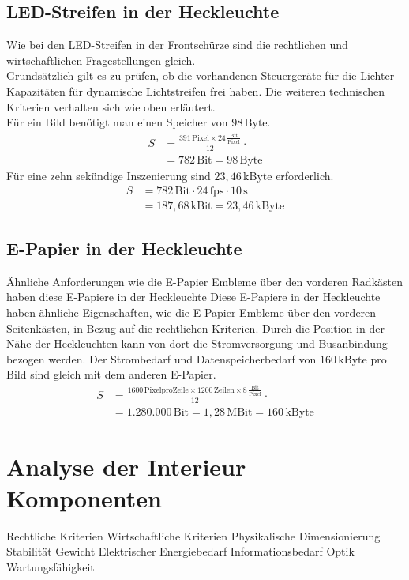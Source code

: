 \subsection{LED-Streifen in der Heckleuchte}
Wie bei den LED-Streifen in der Frontschürze sind die rechtlichen und wirtschaftlichen Fragestellungen gleich. \\
Grundsätzlich gilt es zu prüfen, ob die vorhandenen Steuergeräte für die Lichter Kapazitäten für dynamische Lichtstreifen frei haben.
Die weiteren technischen Kriterien verhalten sich wie oben erläutert. \\
Für ein Bild benötigt man einen Speicher von $ 98\,\mathrm{Byte} $.
\begin{align}
	S &= \frac{391\,\mathrm{Pixel} \times 24\,\frac{\mathrm{Bit}}{\mathrm{Pixel}}}{12} \cdot \\
	&= 782\,\mathrm{Bit} = 98\,\mathrm{Byte}
\end{align}
Für eine zehn sekündige Inszenierung sind $ 23,46\,\mathrm{kByte} $ erforderlich.
\begin{align}
	S &= 782\,\mathrm{Bit} \cdot 24\,\mathrm{fps} \cdot 10\,\mathrm{s}\\
	&= 187,68\,\mathrm{kBit} = 23,46\,\mathrm{kByte}
\end{align}
\subsection{E-Papier in der Heckleuchte}
Ähnliche Anforderungen wie die E-Papier Embleme über den vorderen Radkästen haben diese E-Papiere in der Heckleuchte
Diese E-Papiere in der Heckleuchte haben ähnliche Eigenschaften, wie die E-Papier Embleme über den vorderen Seitenkästen, in Bezug auf die rechtlichen Kriterien. Durch die Position in der Nähe der Heckleuchten kann von dort die Stromversorgung und Busanbindung bezogen werden. Der Strombedarf und Datenspeicherbedarf von $ 160\,\mathrm{kByte} $ pro Bild sind gleich mit dem anderen E-Papier. 
\begin{align}
	S &= \frac{1600\,\mathrm{Pixel pro Zeile} \times 1200\,\mathrm{Zeilen} \times 8\,\frac{\mathrm{Bit}}{\mathrm{Pixel}}}{12} \cdot \\
	&= 1.280.000\,\mathrm{Bit} = 1,28\,\mathrm{MBit} = 160\,\mathrm{kByte}
\end{align}
\section{Analyse der Interieur Komponenten}
Rechtliche Kriterien
Wirtschaftliche Kriterien
Physikalische Dimensionierung
Stabilität
Gewicht
Elektrischer Energiebedarf
Informationsbedarf
Optik
Wartungsfähigkeit

